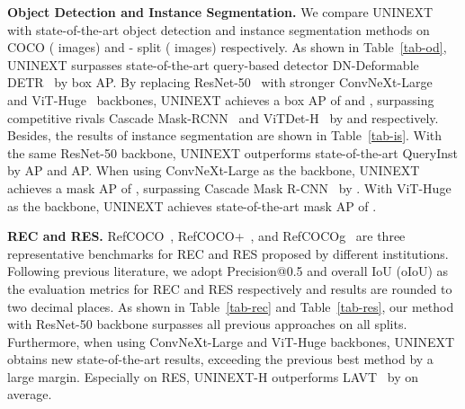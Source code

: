 \documentclass[10pt,twocolumn,letterpaper]{article}
\begin{document}
\textbf{Object Detection and Instance Segmentation.} We compare UNINEXT with state-of-the-art object detection and instance segmentation methods on COCO  ( images) and - split ( images) respectively. As shown in Table~\ref{tab-od}, UNINEXT surpasses state-of-the-art query-based detector DN-Deformable DETR~\cite{DN-DETR} by  box AP. By replacing ResNet-50~\cite{ResNet} with stronger ConvNeXt-Large~\cite{ConvNeXt} and ViT-Huge~\cite{ViT} backbones, UNINEXT achieves a box AP of  and , surpassing competitive rivals Cascade Mask-RCNN~\cite{CascadeRCNN} and ViTDet-H~\cite{ViTDet} by  and  respectively. Besides, the results of instance segmentation are shown in Table~\ref{tab-is}. With the same ResNet-50 backbone, UNINEXT outperforms state-of-the-art QueryInst by  AP and  AP. When using ConvNeXt-Large as the backbone, UNINEXT achieves a mask AP of , surpassing Cascade Mask R-CNN~\cite{CascadeRCNN} by . With ViT-Huge as the backbone, UNINEXT achieves state-of-the-art mask AP of .




\textbf{REC and RES.} RefCOCO~\cite{RefCOCO&plus}, RefCOCO+~\cite{RefCOCO&plus}, and RefCOCOg~\cite{RefCOCOg-g} are three representative benchmarks for REC and RES proposed by different institutions. Following previous literature, we adopt Precision@0.5 and overall IoU (oIoU) as the evaluation metrics for REC and RES respectively and results are rounded to two decimal places. As shown in Table~\ref{tab-rec} and Table~\ref{tab-res}, our method with ResNet-50 backbone surpasses all previous approaches on all splits. Furthermore, when using ConvNeXt-Large and ViT-Huge backbones, UNINEXT obtains new state-of-the-art results, exceeding the previous best method by a large margin. Especially on RES, UNINEXT-H outperforms LAVT~\cite{LAVT} by  on average.
\end{document}
